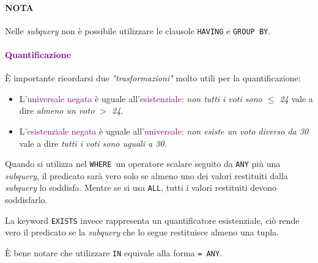 \paragraph{NOTA} Nelle \emph{subquery} non è possibile utilizzare le clausole \verb|HAVING| e \verb|GROUP BY|.

\paragraph{\textcolor{purple}{Quantificazione}} È importante ricordarsi due \emph{"trasformazioni"} molto utili per la quantificazione:
\begin{itemize}
    \item L'\textcolor{purple}{universale negata} è uguale all'\textcolor{purple}{esistenziale}: \emph{non tutti i voti sono $\leq$ 24} vale a dire \emph{almeno un voto $>$ 24}.
    \item L'\textcolor{purple}{esistenziale negata} è uguale all'\textcolor{purple}{universale}: \emph{non esiste un voto diverso da 30} vale a dire \emph{tutti i voti sono uguali a 30}.
\end{itemize}

Quando si utilizza nel \verb|WHERE |un operatore scalare seguito da \verb|ANY| più una \emph{subquery}, il predicato sarà vero solo se almeno
uno dei valori restituiti dalla \emph{subquery} lo soddisfa. Mentre se si usa \verb|ALL|, tutti i valori restituiti devono soddisfarlo.

La keyword \verb|EXISTS| invece rappresenta un quantificatore esistenziale, ciò rende vero il predicato se la \emph{subquery}
che lo segue restituisce almeno una tupla.

È bene notare che utilizzare \verb|IN| equivale alla forma \verb|= ANY|.